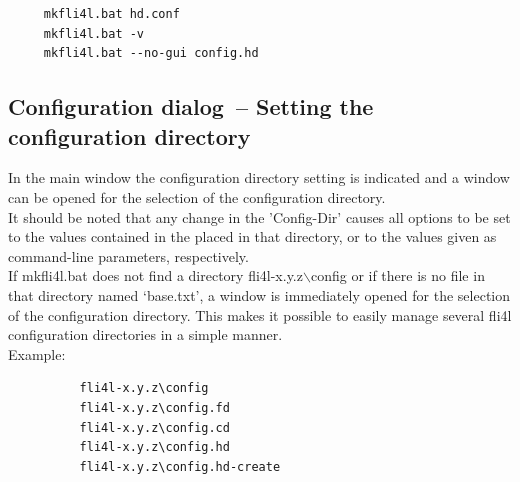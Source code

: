   \begin{verbatim}
     mkfli4l.bat hd.conf
     mkfli4l.bat -v
     mkfli4l.bat --no-gui config.hd
  \end{verbatim}

  \subsection{Configuration dialog~-- Setting the configuration directory}

  In the main window the configuration directory setting is indicated and a window can be opened for
  the selection of the configuration directory.\\

  It should be noted that any change in the 'Config-Dir' causes all options to be set to the values contained in the
   placed in that directory, or to the values
  given as command-line parameters, respectively.\\

  If mkfli4l.bat does not find a directory fli4l-x.y.z$\backslash$config or if there is no file in that directory
  named `base.txt', a window is immediately opened for the selection of the configuration directory.
  This makes it possible to easily manage several fli4l configuration directories in a simple manner.\\

  Example:

\begin{example}
\begin{verbatim}
          fli4l-x.y.z\config
          fli4l-x.y.z\config.fd
          fli4l-x.y.z\config.cd
          fli4l-x.y.z\config.hd
          fli4l-x.y.z\config.hd-create
\end{verbatim}
\end{example}

